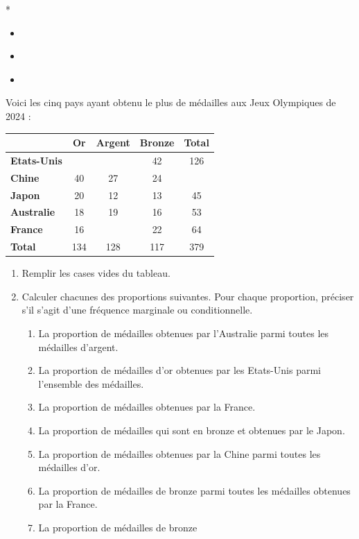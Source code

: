 \documentclass[10pt,a4paper]{article}
\begin{document}
\begin{definition}*
    \begin{itemize}
        \item \;\\
        \vspace{0.7cm}
        \item \;\\
        \vspace{0.7cm}
        \item \;\\
        \vspace{0.7cm}
    \end{itemize}
\end{definition}

\begin{exo}[][]
Voici les cinq pays ayant obtenu le plus de médailles aux Jeux Olympiques de 2024 : 
\begin{center}
\renewcommand{\arraystretch}{1.5}
\begin{tabular}{|l|c|c|c|c|}
\hline
 & \textbf{Or } & \textbf{Argent}& \textbf{Bronze} & \textbf{Total} \\
\hline
\textbf{Etats-Unis} &   &   & 42 & 126 \\
\hline
\textbf{Chine} & 40 & 27 & 24 &   \\
\hline
\textbf{Japon} & 20 & 12 & 13 & 45\\
\hline
\textbf{Australie} & 18 & 19 & 16 & 53\\
\hline
\textbf{France} & 16 &    & 22 & 64\\
\hline
\textbf{Total} & 134 & 128 & 117 & 379 \\
\hline
\end{tabular}
\end{center}
\begin{enumerate}
    \item Remplir les cases vides du tableau.  
    \item Calculer chacunes des proportions suivantes. Pour chaque proportion, préciser s'il s'agit d'une fréquence marginale ou conditionnelle.
    \begin{enumerate}
        \item La proportion de médailles obtenues par l'Australie parmi toutes les médailles d'argent.
        \item La proportion de médailles d'or obtenues par les Etats-Unis parmi l'ensemble des médailles.
        \item La proportion de médailles obtenues par la France.
        \item La proportion de médailles qui sont en bronze et obtenues par le Japon.
        \item La proportion de médailles obtenues par la Chine parmi toutes les médailles d'or.
        \item La proportion de médailles de bronze parmi toutes les médailles obtenues par la France.
        \item La proportion de médailles de bronze
    \end{enumerate}
\end{enumerate}
\end{exo}
\end{document}
